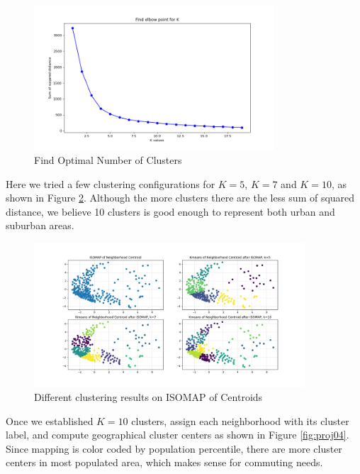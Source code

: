 \documentclass{article}
\begin{document}
\begin{figure}[ht]
\centering
\includegraphics[width=0.8\textwidth]{proj02.png}
\vspace*{-10mm}
\caption{Find Optimal Number of Clusters}
\label{fig:proj02}
\end{figure}

Here we tried a few clustering configurations for $K=5$, $K=7$ and $K=10$, as shown in Figure \ref{fig:proj03}. Although the more clusters there are the less sum of squared distance, we believe 10 clusters is good enough to represent both urban and suburban areas. 

\begin{figure}[ht]
\centering
\includegraphics[width=0.9\textwidth]{proj03.png}
\vspace*{-10mm}
\caption{Different clustering results on ISOMAP of Centroids }
\label{fig:proj03}
\end{figure}

Once we established $K=10$ clusters, assign each neighborhood with its cluster label, and compute geographical cluster centers as shown in Figure \ref{fig:proj04}. Since mapping is color coded by population percentile, there are more cluster centers in most populated area, which makes sense for commuting needs.
\end{document}

